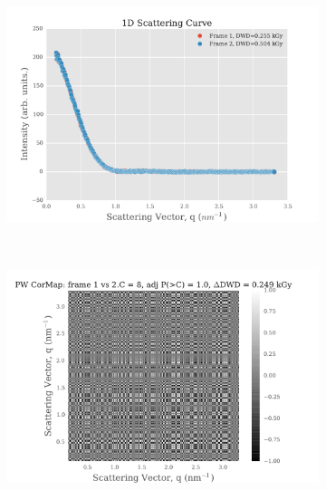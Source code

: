 \begin{figure}
    \centering
    \begin{subfigure}[b]{0.9\textwidth}
            \centering
            \includegraphics[width=\textwidth]{figures/saxs/scatter_curve_frames_1_2.pdf}
            \caption{}
            \label{fig:1D scatter plot of frames 1 and 2}
    \end{subfigure}
    \\
    \begin{subfigure}[b]{0.9\textwidth}
            \centering
            \includegraphics[width=\textwidth]{figures/saxs/pwcormap_frames_1_2.pdf}
            \caption{}
            \label{fig:Pairwise correlation frames 1 and 2}
    \end{subfigure}
\end{figure}
